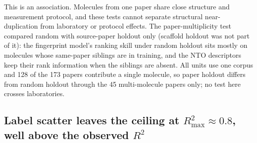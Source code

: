 This is an association. Molecules from one paper share close structure and measurement protocol,
and these tests cannot separate structural near-duplication from laboratory or protocol effects. The
paper-multiplicity test compared random with source-paper holdout only (scaffold holdout was not
part of it): the fingerprint model's ranking skill under random holdout sits mostly on molecules whose
same-paper siblings are in training, and the NTO descriptors keep their rank information when
the siblings are absent. All units use one corpus and \num{128} of the \num{173} papers contribute a
single molecule, so paper holdout differs from random holdout through the \num{45} multi-molecule papers
only; no test here crosses laboratories.

\subsection{Label scatter leaves the ceiling at $R^2_\text{max} \approx 0.8$, well above the observed $R^2$}\label{subsec:ceilings}

